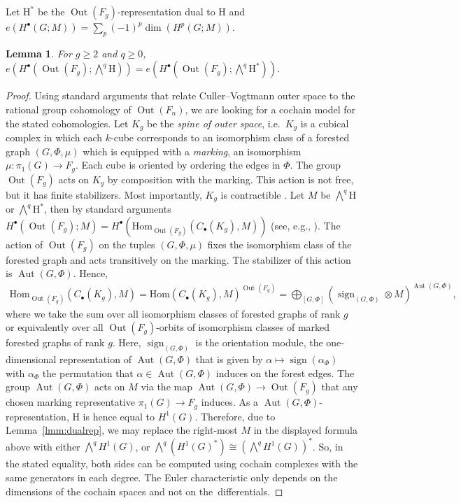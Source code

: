 \documentclass[oneside]{amsart}
\newtheorem{lemma}[theorem]{Lemma}
\theoremstyle{remark}
\newcommand{\Aut}{{\operatorname{Aut}}}
\newcommand{\Out}{{\operatorname{Out}}}
\newcommand{\sign}{{\operatorname{sign}}}
\begin{document}
Let $\mathrm H^*$ be the $\Out(F_g)$-representation dual to $\mathrm H$
and $e(H^{\bullet}\left(G;M\right)) = \sum\limits_p (-1)^p \dim (H^{p}\left(G;M\right))$.
\begin{lemma}
\label{lmm:group_cohom_dual}
For $g \geq 2$ and $q \geq 0$,
$e\left( H^{\bullet}\left(\Out(F_g);\bigwedge\nolimits^q \mathrm H\right) \right)= e\left( H^{\bullet}\left(\Out(F_g);\bigwedge\nolimits^q \mathrm H^*\right) \right) $.
\end{lemma}
\begin{proof}
Using standard arguments that relate Culler--Vogtmann outer space to the rational group cohomology of $\Out(F_n)$, %
we are looking for a cochain model for the stated cohomologies.
Let $K_g$ be the \emph{spine of outer space},
i.e.~$K_g$ is a cubical complex in which each $k$-cube
corresponds to an isomorphism class of a forested graph $(G,\Phi,\mu)$ 
which is equipped with a \emph{marking}, an isomorphism $\mu:\pi_1(G) \rightarrow F_g$. Each cube is oriented by ordering the edges in $\Phi$.
The group $\Out(F_g)$ acts on $K_g$ by composition with the marking.
This action is not free, but it has finite stabilizers. 
Most importantly, $K_g$ is contractible \cite{CV}.
Let $M$ be $\bigwedge\nolimits^q \mathrm H$ or $\bigwedge\nolimits^q \mathrm H^*$, then by standard arguments
$H^{\bullet}\left(\Out(F_g);M\right) = H^{\bullet}\left( \mathrm{Hom}_{\Out(F_g)} (C_\bullet(K_g), M) \right)$
(see, e.g., \cite[Ch.~7]{Br}).
The action of $\Out(F_g)$ on the tuples $(G,\Phi,\mu)$ fixes the 
isomorphism class of the forested graph and acts transitively on the marking.
The stabilizer of this action is $\Aut(G,\Phi)$.
%
Hence,
\begin{align*} \mathrm{Hom}_{\Out(F_g)} (C_\bullet(K_g), M) = \mathrm{Hom} (C_\bullet(K_g), M)^{\Out(F_g)} = \bigoplus_{[G,\Phi]} \left( \sign_{(G,\Phi)} \otimes M \right)^{\Aut(G,\Phi)}, \end{align*}
where we take the sum over all isomorphism classes of 
forested graphs of rank $g$
or equivalently over all $\Out(F_g)$-orbits of 
isomorphism classes of marked forested graphs of rank $g$.
Here, $\sign_{(G,\Phi)}$ is the orientation module, the one-dimensional representation of $\Aut(G,\Phi)$ that is given by $\alpha \mapsto \sign(\alpha_\Phi)$ with $\alpha_\Phi$ the permutation that $\alpha \in \Aut(G,\Phi)$ induces on the forest edges. 
The group
$\Aut(G,\Phi)$ acts on $M$ via the map $\Aut(G,\Phi) \rightarrow \Out(F_g)$ that any
chosen marking representative $\pi_1(G)\rightarrow F_g$ induces.
As a $\Aut(G,\Phi)$-representation, $\mathrm H$ is hence 
equal to $H^1(G)$. Therefore, due to Lemma~\ref{lmm:dualrep},
we may replace the right-most $M$ in the displayed formula above with 
either $\bigwedge\nolimits^q H^1(G)$, or $\bigwedge\nolimits^q (H^1(G)^*) \cong (\bigwedge\nolimits^q H^1(G))^*$.
So, in the stated equality, both sides can be computed using cochain complexes with the same generators in each degree. The Euler characteristic only depends on the dimensions of the cochain spaces and not on the~differentials.
\end{proof}
\end{document}
